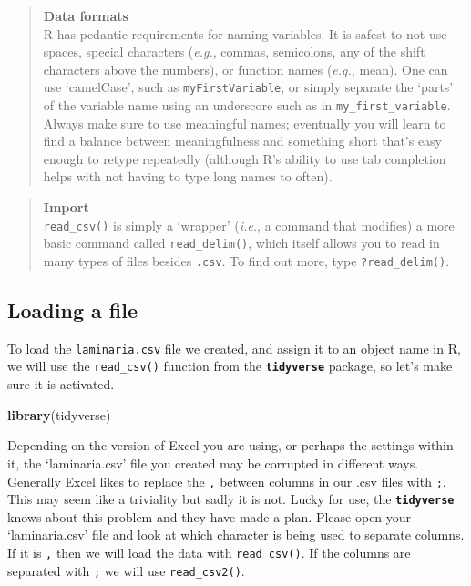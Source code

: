 \documentclass[
]{book}
\newenvironment{Shaded}{\begin{snugshade}}{\end{snugshade}}
\newcommand{\KeywordTok}[1]{\textcolor[rgb]{0.13,0.29,0.53}{\textbf{#1}}}
\newcommand{\NormalTok}[1]{#1}
\begin{document}
\begin{quote}
\textbf{Data formats}\\
R has pedantic requirements for naming variables. It is safest to not use spaces, special characters (\emph{e.g.}, commas, semicolons, any of the shift characters above the numbers), or function names (\emph{e.g.}, mean). One can use `camelCase', such as \texttt{myFirstVariable}, or simply separate the `parts' of the variable name using an underscore such as in \texttt{my\_first\_variable}. Always make sure to use meaningful names; eventually you will learn to find a balance between meaningfulness and something short that's easy enough to retype repeatedly (although R's ability to use tab completion helps with not having to type long names to often).
\end{quote}

\begin{quote}
\textbf{Import}\\
\texttt{read\_csv()} is simply a `wrapper' (\emph{i.e.}, a command that modifies) a more basic command called \texttt{read\_delim()}, which itself allows you to read in many types of files besides \texttt{.csv}. To find out more, type \texttt{?read\_delim()}.
\end{quote}

\hypertarget{loading-a-file}{%
\subsection{Loading a file}\label{loading-a-file}}

To load the \texttt{laminaria.csv} file we created, and assign it to an object name in R, we will use the \texttt{read\_csv()} function from the \textbf{\texttt{tidyverse}} package, so let's make sure it is activated.

\begin{Shaded}
\begin{Highlighting}[]
\KeywordTok{library}\NormalTok{(tidyverse)}
\end{Highlighting}
\end{Shaded}

Depending on the version of Excel you are using, or perhaps the settings within it, the `laminaria.csv' file you created may be corrupted in different ways. Generally Excel likes to replace the \texttt{,} between columns in our .csv files with \texttt{;}. This may seem like a triviality but sadly it is not. Lucky for use, the \textbf{\texttt{tidyverse}} knows about this problem and they have made a plan. Please open your `laminaria.csv' file and look at which character is being used to separate columns. If it is \texttt{,} then we will load the data with \texttt{read\_csv()}. If the columns are separated with \texttt{;} we will use \texttt{read\_csv2()}.
\end{document}
